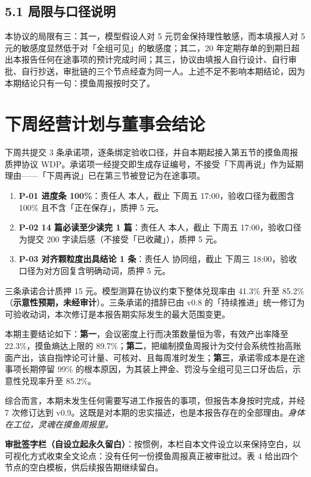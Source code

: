 \documentclass[11pt,a4paper]{article}
\begin{document}
\subsection{5.1 局限与口径说明}
本协议的局限有三：其一，模型假设人对 5 元罚金保持理性敏感，而本填报人对 5 元的敏感度显然低于对「全组可见」的敏感度；其二，20 年定期存单的到期日超出本报告任何在途事项的预计完成时间；其三，协议由填报人自行设计、自行审批、自行抄送，审批链的三个节点经查为同一人。上述不足不影响本期结论，因为本期结论只有一句：摸鱼周报按时交了。

\section{下周经营计划与董事会结论}
下周共提交 3 条承诺项，逐条绑定验收口径，并自本期起接入第五节的摸鱼周报质押协议 WDP。承诺项一经提交即生成存证编号，不接受「下周再说」作为延期理由——「下周再说」已在第三节被登记为在途事项。

\begin{enumerate}
\item \textbf{P-01 进度条 100\%}：责任人 本人，截止 下周五 17:00，验收口径为截图含 100\% 且不含「正在保存」，质押 5 元。
\item \textbf{P-02 14 篇必读至少读完 1 篇}：责任人 本人，截止 下周五 17:00，验收口径为提交 200 字读后感（不接受「已收藏」），质押 5 元。
\item \textbf{P-03 对齐颗粒度出具结论 1 条}：责任人 协同组，截止 下周三 18:00，验收口径为对方回复含明确动词，质押 5 元。
\end{enumerate}

三条承诺合计质押 15 元。模型测算在协议约束下整体兑现率由 41.3\% 升至 85.2\%（\textbf{示意性预期，未经审计}）。三条承诺的措辞已由 v0.8 的「持续推进」统一修订为可验收动词，本次修订是本报告期实际发生的最大范围变更。

本期主要结论如下：\textbf{第一}，会议密度上行而决策数量恒为零，有效产出率降至 22.3\%，摸鱼熵达上限的 89.7\%；\textbf{第二}，把编制摸鱼周报计为交付会系统性抬高账面产出，该自指悖论可计量、可核对、且每周准时发生；\textbf{第三}，承诺零成本是在途事项长期停留 99\% 的根本原因，为其装上押金、罚没与全组可见三口牙齿后，示意性兑现率升至 85.2\%。

综合而言，本期未发生任何需要写进工作报告的事项，但报告本身按时完成，并经 7 次修订达到 v0.9。这既是对本期的忠实描述，也是本报告存在的全部理由。\textit{身体在工位，灵魂在摸鱼周报里。}

\textbf{审批签字栏（自设立起永久留白）}：按惯例，本栏自本文件设立以来保持空白，以可视化方式收束全文论点：没有任何一份摸鱼周报真正被审批过。表 4 给出四个节点的空白模板，供后续报告期继续留白。
\end{document}
